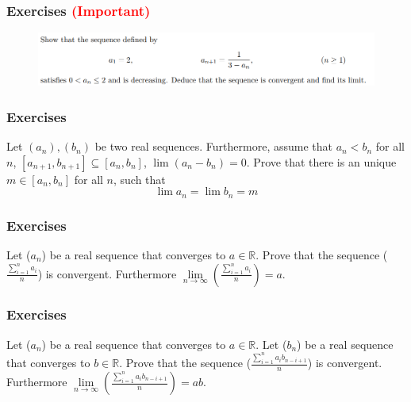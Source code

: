 \documentclass{beamer}
\begin{document}
\begin{frame}
    \frametitle{Exercises \textcolor{red}{(Important)}}
    \begin{figure}[htbp]
        \centering
        \includegraphics[width=12cm]{sequenceExercise.png}
    \end{figure}
\end{frame}

\begin{frame}
    \frametitle{Exercises}
    Let $(a_n),(b_n)$ be two real sequences. Furthermore, assume that $a_n<b_n$
    for all $n$, $[a_{n+1}, b_{n+1}]\subseteq [a_n,b_n]$, $\lim (a_n-b_n)=0$. Prove that there
    is an unique $m\in [a_n,b_n]$ for all $n$, such that
    \begin{equation*}
        \lim a_n=\lim b_n=m
    \end{equation*}
\end{frame}
\begin{frame}
    \frametitle{Exercises}
    Let ($a_n$) be a real sequence that converges to $a \in \mathbb{R}$.
    Prove that the sequence ($\frac{\sum_{i=1}^n a_i}{n}$) is convergent.
    Furthermore $\underset{n\rightarrow \infty}{\lim} (\frac{\sum_{i=1}^n a_i}{n})=a $.
\end{frame}

\begin{frame}
    \frametitle{Exercises}
    Let ($a_n$) be a real sequence that converges to $a \in \mathbb{R}$.
    Let ($b_n$) be a real sequence that converges to $b \in \mathbb{R}$.
    Prove that the sequence ($\frac{\sum_{i=1}^n a_{i}b_{n-i+1}}{n}$) is convergent.
    Furthermore $\underset{n\rightarrow \infty}{\lim} (\frac{\sum_{i=1}^n a_{i}b_{n-i+1}}{n})=ab$.
\end{frame}
\end{document}
